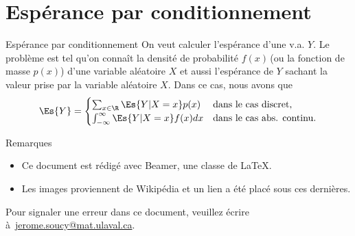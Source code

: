 \documentclass[nuit,charter,pied]{BeamerJS}
\begin{document}
\section{Espérance par conditionnement}
\begin{frame}{Espérance par conditionnement}
	On veut calculer l'espérance d'une v.a. $Y$. Le problème est tel qu'on connaît la densité de probabilité $f(x)$\,(ou la fonction de masse $p(x)$) d'une variable aléatoire $X$ et aussi l'espérance de $Y$ sachant la valeur prise par la variable aléatoire $X$. Dans ce cas, nous avons que
	\[\Es{Y}=\begin{cases}\sum_{x\in\R}\Es{Y|X=x}p(x)&\text{dans le cas discret,}\\
		\int_{-\infty}^{\infty}\Es{Y|X=x}f(x)dx&\text{dans le cas abs. continu.}\end{cases}\]
\end{frame}
\begin{frame}{Remarques}

 \begin{rems}
 	\begin{itemize}
 		\item Ce document est rédigé avec Beamer, une classe de \LaTeX.
		\item Les images proviennent de Wikipédia et un lien a été placé sous ces dernières.
 	\end{itemize}
 \end{rems}

 	\vfill
 	\footnotesize Pour signaler une erreur dans ce document, veuillez écrire à~\href{mailto:jerome.soucy@mat.ulaval.ca}{jerome.soucy@mat.ulaval.ca}.
 \end{frame}
\end{document}
